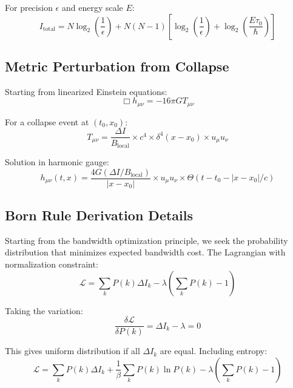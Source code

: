 \documentclass[twocolumn,prd,amsmath,amssymb,aps,superscriptaddress,nofootinbib]{revtex4-2}
\begin{document}
For precision $\epsilon$ and energy scale $E$:
\begin{equation}
I_{\text{total}} = N \log_2\left(\frac{1}{\epsilon}\right) + N(N-1)\left[\log_2\left(\frac{1}{\epsilon}\right) + \log_2\left(\frac{E\tau_0}{\hbar}\right)\right]
\end{equation}

\subsection{Metric Perturbation from Collapse}

Starting from linearized Einstein equations:
\begin{equation}
\Box h_{\mu\nu} = -16\pi G T_{\mu\nu}
\end{equation}

For a collapse event at $(t_0,x_0)$:
\begin{equation}
T_{\mu\nu} = \frac{\Delta I}{B_{\text{local}}} \times c^4 \times \delta^4(x-x_0) \times u_\mu u_\nu
\end{equation}

Solution in harmonic gauge:
\begin{equation}
h_{\mu\nu}(t,x) = \frac{4G(\Delta I/B_{\text{local}})}{|x-x_0|} \times u_\mu u_\nu \times \Theta(t-t_0-|x-x_0|/c)
\end{equation}

\subsection{Born Rule Derivation Details}

Starting from the bandwidth optimization principle, we seek the probability distribution that minimizes expected bandwidth cost. The Lagrangian with normalization constraint:
\begin{equation}
\mathcal{L} = \sum_k P(k) \Delta I_k - \lambda\left(\sum_k P(k) - 1\right)
\end{equation}

Taking the variation:
\begin{equation}
\frac{\delta\mathcal{L}}{\delta P(k)} = \Delta I_k - \lambda = 0
\end{equation}

This gives uniform distribution if all $\Delta I_k$ are equal. Including entropy:
\begin{equation}
\mathcal{L} = \sum_k P(k) \Delta I_k + \frac{1}{\beta}\sum_k P(k)\ln P(k) - \lambda\left(\sum_k P(k) - 1\right)
\end{equation}
\end{document}
